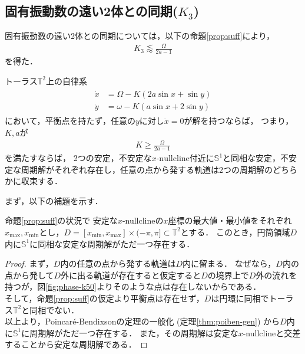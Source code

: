 \documentclass[../main]{subfiles}
\begin{document}
    \subsection{固有振動数の遠い2体との同期($K_3$)}
    \label{sec:3body-k3}
    固有振動数の遠い2体との同期については，以下の命題\ref{prop:suff}により，
    \begin{align*}
        K_3\lessapprox \frac{\Omega}{2a-1}
    \end{align*}
    を得た．
    \begin{proposition}
        \label{prop:suff}
        トーラス$\mathbb{T}^2$上の自律系
        \begin{align}
            \label{eq:prop-2phase}
            \begin{split}
                \dot{x}&=\Omega-K(2a\sin x+\sin y)\\
                \dot{y}&=\omega-K(a\sin x+2\sin y)
            \end{split}
        \end{align}
        において，平衡点を持たず，任意の$y$に対し$\dot{x}=0$が解を持つならば，
        つまり，$K,a$が
        \begin{align*}
            K\geq \frac{\Omega}{2a-1}
        \end{align*}
        を満たすならば，
        2つの安定，不安定な$x$-$\mathrm{nullcline}$付近に$\mathbb{S}^1$と同相な安定，不安定な周期解がそれぞれ存在し，任意の点から発する軌道は2つの周期解のどちらかに収束する．
    \end{proposition}
    まず，以下の補題を示す．
    \begin{lemma}
        \label{lemma:annulus}
        命題\ref{prop:suff}の状況で
        安定な$x$-nullclineの$x$座標の最大値・最小値をそれぞれ$x_{\max},x_{\min}$とし，$D=[x_{\min},x_{\max}]\times (-\pi,\pi ]\subset\mathbb{T}^2$とする．
        このとき，円筒領域$D$内に$\mathbb{S}^1$に同相な安定な周期解がただ一つ存在する．        
    \end{lemma}
    \begin{proof}
        まず，$D$内の任意の点から発する軌道は$D$内に留まる．
        なぜなら，$D$内の点から発して$D$外に出る軌道が存在すると仮定すると$D$の境界上で$D$外の流れを持つが，図\ref{fig:phase-k50}よりそのような点は存在しないからである．\\
        そして，命題\ref{prop:suff}の仮定より平衡点は存在せず，$D$は円環に同相でトーラス$\mathbb{T}^2$と同相でない．\\
        以上より，Poincaré-Bendixsonの定理の一般化 (定理\ref{thm:poiben-gen}) から$D$内に$\mathbb{S}^1$に周期解がただ一つ存在する．
        また，その周期解は安定な$x$-nullclineと交差することから安定な周期解である．        
    \end{proof}
\end{document}

